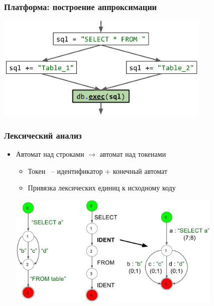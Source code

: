 \documentclass{beamer}
\begin{document}
\begin{frame}[fragile]
	\transwipe[direction=90]
	\frametitle{Платформа: построение аппроксимации}
	\begin{center}
            \includegraphics[width=290pt]{pictures/approximation_result.png}
        \end{center}
\end{frame}

\begin{frame}[fragile]
	\transwipe[direction=90]
	\frametitle{Лексический анализ}
	\begin{itemize}
	    	\item Автомат над строками $\rightarrow$ автомат над токенами
    		\begin{itemize}
			\item Токен ~-- идентификатор + конечный автомат
			\item Привязка лексических единиц к исходному коду
	    	\end{itemize}
		\begin{center}
			\includegraphics[width=290pt]{pictures/lexing.jpg}
		\end{center}
        \end{itemize}
\end{frame}
\end{document}

